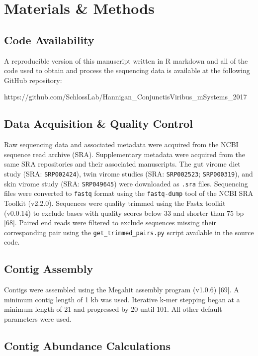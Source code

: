 \documentclass[12pt,]{article}
\begin{document}
\section{Materials \& Methods}\label{materials-methods}

\subsection{Code Availability}\label{code-availability}

A reproducible version of this manuscript written in R markdown and all
of the code used to obtain and process the sequencing data is available
at the following GitHub repository:

https://github.com/SchlossLab/Hannigan\_ConjunctisViribus\_mSystems\_2017

\subsection{Data Acquisition \& Quality
Control}\label{data-acquisition-quality-control}

Raw sequencing data and associated metadata were acquired from the NCBI
sequence read archive (SRA). Supplementary metadata were acquired from
the same SRA repositories and their associated manuscripts. The gut
virome diet study (SRA: \texttt{SRP002424}), twin virome studies (SRA:
\texttt{SRP002523}; \texttt{SRP000319}), and skin virome study (SRA:
\texttt{SRP049645}) were downloaded as \texttt{.sra} files. Sequencing
files were converted to \texttt{fastq} format using the
\texttt{fastq-dump} tool of the NCBI SRA Toolkit (v2.2.0). Sequences
were quality trimmed using the Fastx toolkit (v0.0.14) to exclude bases
with quality scores below 33 and shorter than 75 bp {[}68{]}. Paired end
reads were filtered to exclude sequences missing their corresponding
pair using the \texttt{get\_trimmed\_pairs.py} script available in the
source code.

\subsection{Contig Assembly}\label{contig-assembly}

Contigs were assembled using the Megahit assembly program (v1.0.6)
{[}69{]}. A minimum contig length of 1 kb was used. Iterative k-mer
stepping began at a minimum length of 21 and progressed by 20 until 101.
All other default parameters were used.

\subsection{Contig Abundance
Calculations}\label{contig-abundance-calculations}
\end{document}
